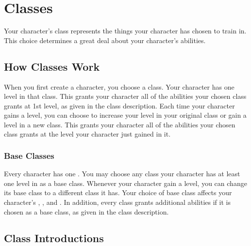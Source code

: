 \chapter{Classes}\label{Classes}

Your character's class represents the things your character has chosen to train in.
This choice determines a great deal about your character's abilities.

\section{How Classes Work}
    When you first create a character, you choose a class.
    Your character has one level in that class.
    This grants your character all of the abilities your chosen class grants at 1st level, as given in the class description.
    Each time your character gains a level, you can choose to increase your level in your original class or gain a level in a new class.
    This grants your character all of the abilities your chosen class grants at the level your character just gained in it.

    \subsection{Base Classes}
        Every character has one .
        You may choose any class your character has at least one level in as a base class.
        Whenever your character gain a level, you can change its base class to a different class it has.
        Your choice of base class affects your character's , , and .
        In addition, every class grants additional abilities if it is chosen as a base class, as given in the class description.

\section{Class Introductions}

